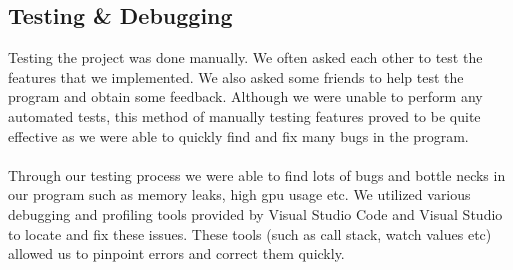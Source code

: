 \documentclass[report.tex]{subfiles}
\begin{document}
\begin{large}
    \subsection{Testing \& Debugging}

    Testing the project was done manually. We often asked each other to test the features that we implemented. We also asked some friends to help test the program and obtain some feedback.
    Although we were unable to perform any automated tests, this method of manually testing features proved to be quite effective as we were able to quickly find and fix many bugs in the program.\\\\
    Through our testing process we were able to find lots of bugs and bottle necks in our program such as memory leaks, high gpu usage etc.
    We utilized various debugging and profiling tools provided by Visual Studio Code and Visual Studio to locate and fix these issues. 
    These tools (such as call stack, watch values etc) allowed us to pinpoint errors and correct them quickly.
\end{large}
\end{document}
